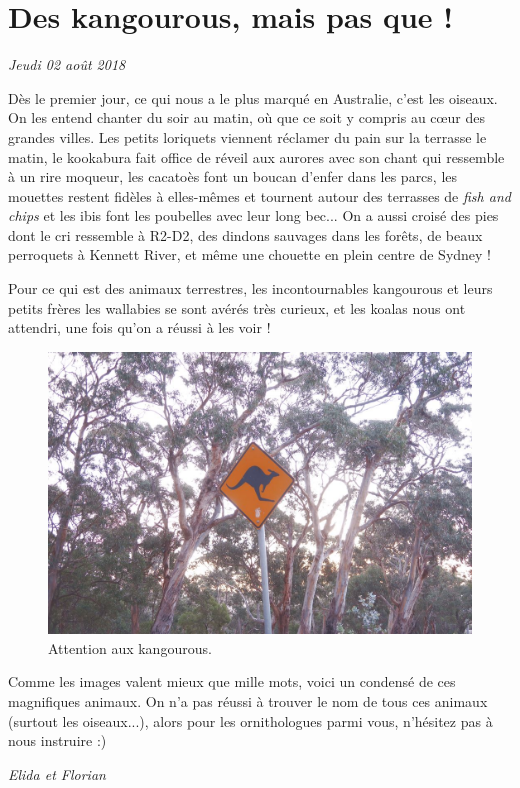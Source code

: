 \hypertarget{des-kangourous-mais-pas-que}{%
\section{Des kangourous, mais pas que
!}\label{des-kangourous-mais-pas-que}}

\emph{Jeudi 02 août 2018}

Dès le premier jour, ce qui nous a le plus marqué en Australie, c'est
les oiseaux. On les entend chanter du soir au matin, où que ce soit y
compris au cœur des grandes villes. Les petits loriquets viennent
réclamer du pain sur la terrasse le matin, le kookabura fait office de
réveil aux aurores avec son chant qui ressemble à un rire moqueur, les
cacatoès font un boucan d'enfer dans les parcs, les mouettes restent
fidèles à elles-mêmes et tournent autour des terrasses de \emph{fish and
chips} et les ibis font les poubelles avec leur long bec... On a aussi
croisé des pies dont le cri ressemble à R2-D2, des dindons sauvages dans
les forêts, de beaux perroquets à Kennett River, et même une chouette en
plein centre de Sydney !

Pour ce qui est des animaux terrestres, les incontournables kangourous
et leurs petits frères les wallabies se sont avérés très curieux, et les
koalas nous ont attendri, une fois qu'on a réussi à les voir !

\begin{figure}
\centering
\includegraphics{images/20180802_kangourou.JPG}
\caption{Attention aux kangourous.}
\end{figure}

Comme les images valent mieux que mille mots, voici un condensé de ces
magnifiques animaux. On n'a pas réussi à trouver le nom de tous ces
animaux (surtout les oiseaux...), alors pour les ornithologues parmi
vous, n'hésitez pas à nous instruire :)

\emph{Elida et Florian}
